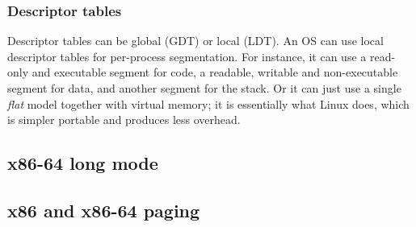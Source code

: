 \documentclass[toc]{../cs-classes/cs-classes}
\begin{document}
\subsubsection{Descriptor tables}
Descriptor tables can be global (GDT) or local (LDT). An OS can use local descriptor tables for per-process segmentation. For instance, it can use a read-only and executable segment for code, a readable, writable and non-executable segment for data, and another segment for the stack. Or it can just use a single \emph{flat} model together with virtual memory; it is essentially what Linux does, which is simpler portable and produces less overhead.

\subsection{x86-64 long mode}

\subsection{x86 and x86-64 paging}
\end{document}
